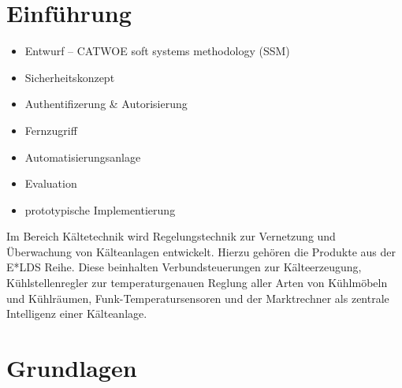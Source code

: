 \documentclass[11pt,a4paper]{report}
\begin{document}

\tableofcontents
\clearpage 


\chapter{Einführung} \label{chap:intro}

\begin{itemize}
\item Entwurf -- CATWOE soft systems methodology (SSM)
\item Sicherheitskonzept
\item Authentifizerung \& Autorisierung
\item Fernzugriff
\item Automatisierungsanlage
\item Evaluation
\item prototypische Implementierung
\end{itemize}
 
Im Bereich Kältetechnik wird Regelungstechnik zur Vernetzung und Überwachung von Kälteanlagen entwickelt. Hierzu gehören die Produkte aus der E*LDS Reihe. Diese beinhalten Verbundsteuerungen zur Kälteerzeugung, Kühlstellenregler zur temperaturgenauen Reglung aller Arten von Kühlmöbeln und Kühlräumen, Funk-Temperatursensoren und der Marktrechner als zentrale Intelligenz einer Kälteanlage.

\chapter{Grundlagen} \label{chap:basics}
\end{document}
